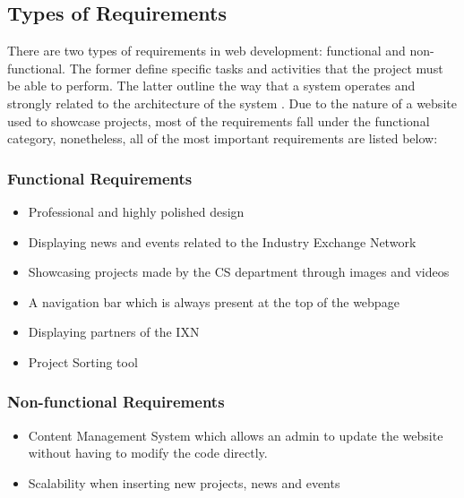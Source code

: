 \documentclass[fontsize=11pt]{extarticle}
\numberwithin{figure}{section} %
\providecommand{\tightlist}{%
  \setlength{\itemsep}{0pt}\setlength{\parskip}{0pt}}
\begin{document}
\hypertarget{types-of-requirements}{%
\subsection{Types of Requirements}\label{types-of-requirements}}

There are two types of requirements in web development: functional and
non-functional. The former define specific tasks and activities that the
project must be able to perform. The latter outline the way that a
system operates and strongly related to the architecture of the system
\cite{g5}. Due to the nature of a website used to showcase projects,
most of the requirements fall under the functional category,
nonetheless, all of the most important requirements are listed below:

\hypertarget{functional-requirements}{%
\subsubsection{Functional Requirements}\label{functional-requirements}}

\begin{itemize}
\tightlist
\item
  Professional and highly polished design
\item
  Displaying news and events related to the Industry Exchange Network
\item
  Showcasing projects made by the CS department through images and
  videos
\item
  A navigation bar which is always present at the top of the webpage
\item
  Displaying partners of the IXN
\item
  Project Sorting tool
\end{itemize}

\hypertarget{non-functional-requirements}{%
\subsubsection{Non-functional
Requirements}\label{non-functional-requirements}}

\begin{itemize}
\tightlist
\item
  Content Management System which allows an admin to update the website
  without having to modify the code directly.
\item
  Scalability when inserting new projects, news and events
\end{itemize}
\end{document}
